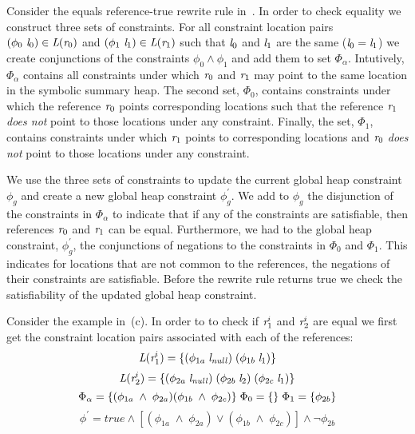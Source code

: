 Consider the equals reference-true rewrite rule
in~. In order to check equality we construct three
sets of constraints. For all constraint location pairs $(\phi_0\ \cfgnt{l}_0)
\in \cfgnt{L}(\cfgnt{r}_0)$ and $(\phi_1\ \emph{l}_1) \in \emph{L}(\emph{r}_1)$ such that $\emph{l}_0$ and $\emph{l}_1$
are the same ($\emph{l}_0 = \emph{l}_1$) we create conjunctions of the constraints
$\phi_0 \wedge \phi_1$ and add them to set $\Phi_\alpha$. Intutively,
$\Phi_\alpha$ contains all constraints under which $\emph{r}_0$ and $\emph{r}_1$ may
point to the same location in the symbolic summary heap. The second
set, $\Phi_0$, contains constraints under which the reference $\emph{r}_0$
points corresponding locations such that the reference $\emph{r}_1$
\emph{does not} point to those locations under any
constraint. Finally, the set, $\Phi_1$, contains constraints under
which $\emph{r}_1$ points to corresponding locations and $\emph{r}_0$ \emph{does
  not} point to those locations under any constraint.

We use the three sets of constraints to update the current global heap
constraint $\phi_g$ and create a new global heap constraint
$\phi_g^\prime$. We add to $\phi_g$ the disjunction of the constraints
in $\Phi_\alpha$ to indicate that if any of the constraints are
satisfiable, then references $\emph{r}_0$ and $\emph{r}_1$ can be
equal. Furthermore, we had to the global heap constraint,
$\phi_g^\prime$, the conjunctions of negations to the constraints in
$\Phi_0$ and $\Phi_1$. This indicates for locations that are not
common to the references, the negations of their constraints are
satisfiable. Before the rewrite rule returns true we check the
satisfiability of the updated global heap constraint.

Consider the example in~(c). In order to to check
if $\emph{r}_1^i$ and $\emph{r}_2^i$ are equal we first get the constraint location
pairs associated with each of the references:
\[
\emph{L}(\emph{r}_1^i) = \{ (\phi_{1a}\; \emph{l}_\mathit{null})\; (\phi_{1b}\; \emph{l}_1) \} 
\]
\[
\emph{L}(\emph{r}_2^i) = \{ (\phi_{2a}\; \emph{l}_\mathit{null})\; (\phi_{2b}\; \emph{l}_2)\; (\phi_{2c}\; \emph{l}_1) \} \\
\]
\[
\Phi_\alpha = \{ (\phi_{1a}\; \wedge\; \phi_{2a} ) (\phi_{1b}\; \wedge\; \phi_{2c} ) \}\;
\Phi_0 = \{ \}\; \Phi_1 = \{ \phi_{2b}\} \\
\]
\[
\phi^\prime = \mathit{true} \wedge [ (\phi_{1a}\; \wedge\; \phi_{2a} )\vee (\phi_{1b}\; \wedge\; \phi_{2c} ) ] \wedge \neg\phi_{2b} 
\]
